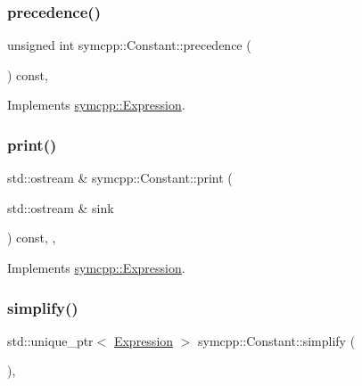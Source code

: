 \subsubsection{\texorpdfstring{precedence()}{precedence()}}
{\footnotesize\ttfamily unsigned int symcpp\+::\+Constant\+::precedence (\begin{DoxyParamCaption}{ }\end{DoxyParamCaption}) const\hspace{0.3cm}{\ttfamily [override]}, {\ttfamily [virtual]}}



Implements \mbox{\hyperlink{classsymcpp_1_1Expression_a181c162d5740faac392ffdca26bfca0c}{symcpp\+::\+Expression}}.

\mbox{\label{classsymcpp_1_1Constant_aca89e2af8df740dba562776e389edab6}} 
\subsubsection{\texorpdfstring{print()}{print()}}
{\footnotesize\ttfamily std\+::ostream \& symcpp\+::\+Constant\+::print (\begin{DoxyParamCaption}\item[{std\+::ostream \&}]{sink }\end{DoxyParamCaption}) const\hspace{0.3cm}{\ttfamily [override]}, {\ttfamily [private]}, {\ttfamily [virtual]}}



Implements \mbox{\hyperlink{classsymcpp_1_1Expression_af37e13032a40f2da4d2866eaa8658049}{symcpp\+::\+Expression}}.

\mbox{\label{classsymcpp_1_1Constant_a082044c6d521c2d31bbadd5db6354f96}} 
\subsubsection{\texorpdfstring{simplify()}{simplify()}}
{\footnotesize\ttfamily std\+::unique\+\_\+ptr$<$ \mbox{\hyperlink{classsymcpp_1_1Expression}{Expression}} $>$ symcpp\+::\+Constant\+::simplify (\begin{DoxyParamCaption}{ }\end{DoxyParamCaption})\hspace{0.3cm}{\ttfamily [override]}, {\ttfamily [virtual]}}



